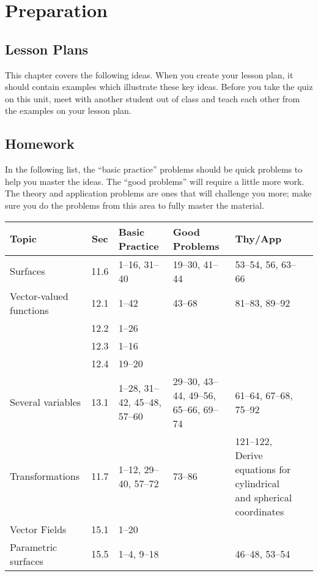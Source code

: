 \section{Preparation}

\subsection{Lesson Plans}

This chapter covers the following ideas. When you create your lesson plan, it should contain examples which illustrate these key ideas. Before you take the quiz on this unit, meet with another student out of class and teach each other from the examples on your lesson plan. 





\subsection{Homework}

In the following list, the ``basic practice'' problems should be quick
problems to help you master the ideas.  The ``good problems'' will
require a little more work.  The theory and application problems are
ones that will challenge you more; make sure you do the problems from
this area to fully master the material.  

{\noindent \footnotesize \begin{tabular}{|p{1.35in}|c|p{1.2in}|p{1.2in}|p{1.5in}|l|}\hline
Topic &Sec &Basic Practice &Good Problems &Thy/App \\\hline
Surfaces & 11.6 & 1--16, 31--40 & 19--30, 41--44 & 53--54, 56, 63--66\\\hline
Vector-valued functions & 12.1 & 1--42 & 43--68 & 81--83, 89--92\\\hline
& 12.2 & 1--26 & &\\\hline
& 12.3 & 1--16 & & \\\hline
& 12.4 & 19--20 & & \\\hline
Several variables& 13.1 & 1--28, 31--42, 45--48, 57--60 & 29--30, 43--44, 49--56, 65--66, 69--74 & 61--64, 67--68, 75--92\\\hline
Transformations & 11.7 & 1--12, 29--40, 57--72 & 73--86 & 121--122, Derive equations for cylindrical and spherical coordinates\\\hline
Vector Fields & 15.1 & 1--20 & & \\\hline
Parametric surfaces & 15.5 & 1--4, 9--18 & & 46--48, 53--54\\\hline
\end{tabular}
}




